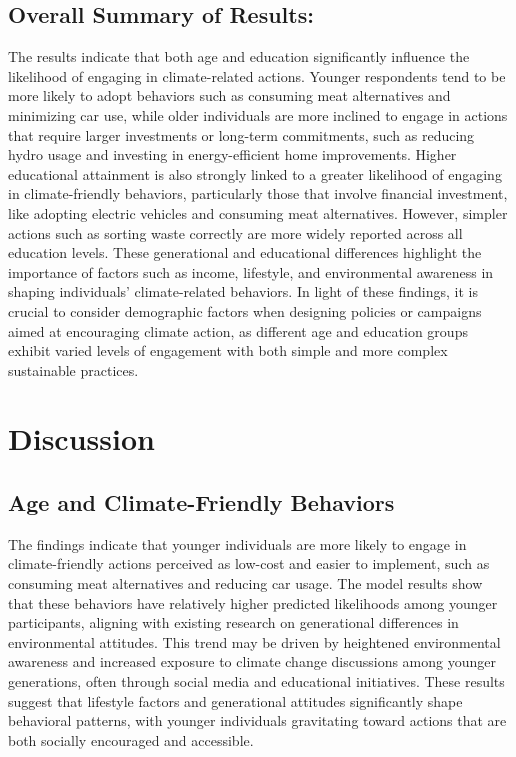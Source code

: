 \documentclass[
  letterpaper,
  DIV=11,
  numbers=noendperiod]{scrartcl}
\begin{document}
\subsection{Overall Summary of
Results:}\label{overall-summary-of-results}

The results indicate that both age and education significantly influence
the likelihood of engaging in climate-related actions. Younger
respondents tend to be more likely to adopt behaviors such as consuming
meat alternatives and minimizing car use, while older individuals are
more inclined to engage in actions that require larger investments or
long-term commitments, such as reducing hydro usage and investing in
energy-efficient home improvements. Higher educational attainment is
also strongly linked to a greater likelihood of engaging in
climate-friendly behaviors, particularly those that involve financial
investment, like adopting electric vehicles and consuming meat
alternatives. However, simpler actions such as sorting waste correctly
are more widely reported across all education levels. These generational
and educational differences highlight the importance of factors such as
income, lifestyle, and environmental awareness in shaping individuals'
climate-related behaviors. In light of these findings, it is crucial to
consider demographic factors when designing policies or campaigns aimed
at encouraging climate action, as different age and education groups
exhibit varied levels of engagement with both simple and more complex
sustainable practices.

\section{Discussion}\label{discussion}

\subsection{Age and Climate-Friendly Behaviors}\label{sec-first-point}

The findings indicate that younger individuals are more likely to engage
in climate-friendly actions perceived as low-cost and easier to
implement, such as consuming meat alternatives and reducing car usage.
The model results show that these behaviors have relatively higher
predicted likelihoods among younger participants, aligning with existing
research on generational differences in environmental attitudes. This
trend may be driven by heightened environmental awareness and increased
exposure to climate change discussions among younger generations, often
through social media and educational initiatives. These results suggest
that lifestyle factors and generational attitudes significantly shape
behavioral patterns, with younger individuals gravitating toward actions
that are both socially encouraged and accessible.
\end{document}
